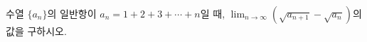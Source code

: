 수열 $\{a_n\}$의 일반항이 $a_n=1+2+3+\cdots+n$일 때, $\displaystyle\lim_{n\to\infty}(\sqrt{a_{n+1}}-\sqrt{a_n})$의 값을 구하시오.
